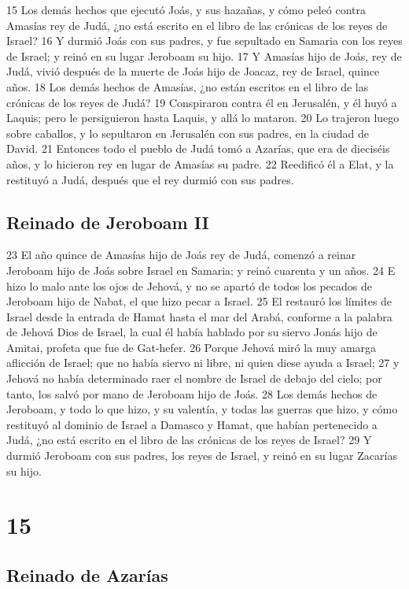15 Los demás hechos que ejecutó Joás, y sus hazañas, y cómo peleó contra Amasías rey de Judá, ¿no está escrito en el libro de las crónicas de los reyes de Israel?
16 Y durmió Joás con sus padres, y fue sepultado en Samaria con los reyes de Israel; y reinó en su lugar Jeroboam su hijo.
17 Y Amasías hijo de Joás, rey de Judá, vivió después de la muerte de Joás hijo de Joacaz, rey de Israel, quince años.
18 Los demás hechos de Amasías, ¿no están escritos en el libro de las crónicas de los reyes de Judá?
19 Conspiraron contra él en Jerusalén, y él huyó a Laquis; pero le persiguieron hasta Laquis, y allá lo mataron.
20 Lo trajeron luego sobre caballos, y lo sepultaron en Jerusalén con sus padres, en la ciudad de David.
21 Entonces todo el pueblo de Judá tomó a Azarías, que era de dieciséis años, y lo hicieron rey en lugar de Amasías su padre.
22 Reedificó él a Elat, y la restituyó a Judá, después que el rey durmió con sus padres.
\section*{Reinado de Jeroboam II}

23 El año quince de Amasías hijo de Joás rey de Judá, comenzó a reinar Jeroboam hijo de Joás sobre Israel en Samaria; y reinó cuarenta y un años.
24 E hizo lo malo ante los ojos de Jehová, y no se apartó de todos los pecados de Jeroboam hijo de Nabat, el que hizo pecar a Israel.
25 El restauró los límites de Israel desde la entrada de Hamat hasta el mar del Arabá, conforme a la palabra de Jehová Dios de Israel, la cual él había hablado por su siervo Jonás hijo de Amitai, profeta que fue de Gat-hefer.
26 Porque Jehová miró la muy amarga aflicción de Israel; que no había siervo ni libre, ni quien diese ayuda a Israel;
27 y Jehová no había determinado raer el nombre de Israel de debajo del cielo; por tanto, los salvó por mano de Jeroboam hijo de Joás.
28 Los demás hechos de Jeroboam, y todo lo que hizo, y su valentía, y todas las guerras que hizo, y cómo restituyó al dominio de Israel a Damasco y Hamat, que habían pertenecido a Judá, ¿no está escrito en el libro de las crónicas de los reyes de Israel?
29 Y durmió Jeroboam con sus padres, los reyes de Israel, y reinó en su lugar Zacarías su hijo.

\chapter{15}

\section*{Reinado de Azarías}

